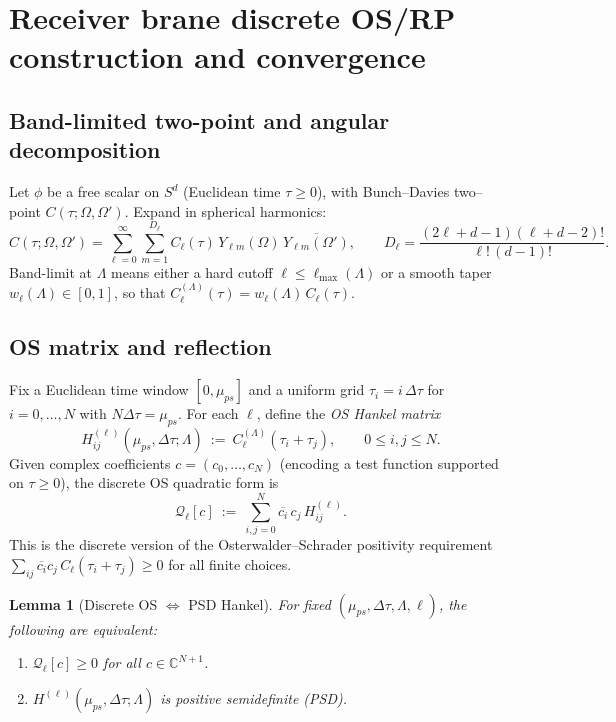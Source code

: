 \documentclass[10pt]{article}
\theoremstyle{definition}
\theoremstyle{plain}
\newtheorem{lemma}{Lemma}[section]
\begin{document}
\newpage
\section{Receiver brane discrete OS/RP construction and convergence}\label{app:OS-discrete}

\subsection{Band-limited two-point and angular decomposition}\label{subsec:uom-main-007}
Let $\phi$ be a free scalar on $S^d$ (Euclidean time $\tau\ge 0$), with Bunch–Davies two–point $C(\tau;\Omega,\Omega')$. Expand in spherical harmonics:
\[
C(\tau;\Omega,\Omega')=\sum_{\ell=0}^\infty\sum_{m=1}^{D_\ell} C_\ell(\tau)\,Y_{\ell m}(\Omega)\,\overline{Y_{\ell m}(\Omega')},\qquad
D_\ell=\frac{(2\ell+d-1)(\ell+d-2)!}{\ell!\,(d-1)!}.
\]
Band-limit at $\Lambda$ means either a hard cutoff $\ell\le \ell_{\max}(\Lambda)$ or a smooth taper $w_\ell(\Lambda)\in[0,1]$, so that
$C_\ell^{(\Lambda)}(\tau)=w_\ell(\Lambda)\,C_\ell(\tau)$.

\subsection{OS matrix and reflection}\label{subsec:uom-main-008}
Fix a Euclidean time window $[0,\mu_{ps}]$ and a uniform grid $\tau_i=i\,\Delta\tau$ for $i=0,\dots,N$ with $N\Delta\tau=\mu_{ps}$. For each $\ell$, define the
\emph{OS Hankel matrix}
\begin{equation}
H^{(\ell)}_{ij}(\mu_{ps},\Delta\tau;\Lambda)\ :=\ C_\ell^{(\Lambda)}(\tau_i+\tau_j),\qquad 0\le i,j\le N.
\label{eq:OS-Hankel}
\end{equation}
Given complex coefficients $c=(c_0,\dots,c_N)$ (encoding a test function supported on $\tau\ge 0$), the discrete OS quadratic form is
\[
\mathcal Q_\ell[c]\ :=\ \sum_{i,j=0}^N \overline{c_i}\,c_j\,H^{(\ell)}_{ij}.
\]
This is the discrete version of the Osterwalder–Schrader positivity requirement
$\sum_{ij}\overline{c_i}c_j\,C_\ell(\tau_i+\tau_j)\ge 0$ for all finite choices.

\begin{lemma}[Discrete OS $\Leftrightarrow$ PSD Hankel]\label{lem:OS-PSD}
For fixed $(\mu_{ps},\Delta\tau,\Lambda,\ell)$, the following are equivalent:
\begin{enumerate}
\item $\mathcal Q_\ell[c]\ge 0$ for all $c\in\mathbb C^{N+1}$.
\item $H^{(\ell)}(\mu_{ps},\Delta\tau;\Lambda)$ is positive semidefinite (PSD).
\end{enumerate}
\end{lemma}
\end{document}
